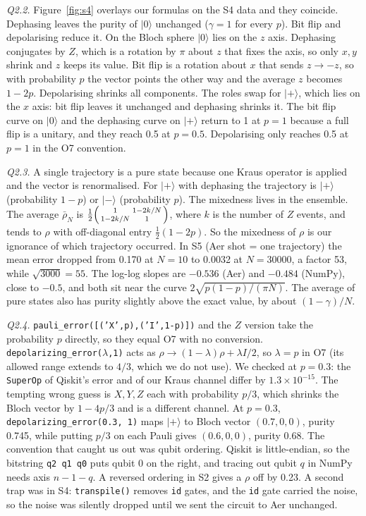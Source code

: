 \documentclass[10pt]{article}
\newcommand{\lab}[1]{\noindent\textit{#1}\;}
\begin{document}
\lab{Q2.2.} Figure~\ref{fig:s4} overlays our formulas on the S4 data and they coincide. Dephasing leaves the purity of $|0\rangle$ unchanged ($\gamma=1$ for every $p$). Bit flip and depolarising reduce it. On the Bloch sphere $|0\rangle$ lies on the $z$ axis. Dephasing conjugates by $Z$, which is a rotation by $\pi$ about $z$ that fixes the axis, so only $x,y$ shrink and $z$ keeps its value. Bit flip is a rotation about $x$ that sends $z\to-z$, so with probability $p$ the vector points the other way and the average $z$ becomes $1-2p$. Depolarising shrinks all components. The roles swap for $|+\rangle$, which lies on the $x$ axis: bit flip leaves it unchanged and dephasing shrinks it. The bit flip curve on $|0\rangle$ and the dephasing curve on $|+\rangle$ return to 1 at $p=1$ because a full flip is a unitary, and they reach 0.5 at $p=0.5$. Depolarising only reaches 0.5 at $p=1$ in the O7 convention.

\lab{Q2.3.} A single trajectory is a pure state because one Kraus operator is applied and the vector is renormalised. For $|+\rangle$ with dephasing the trajectory is $|+\rangle$ (probability $1-p$) or $|-\rangle$ (probability $p$). The mixedness lives in the ensemble. The average $\bar\rho_N$ is $\tfrac12\begin{psmallmatrix}1&1-2k/N\\1-2k/N&1\end{psmallmatrix}$, where $k$ is the number of $Z$ events, and tends to $\rho$ with off-diagonal entry $\tfrac12(1-2p)$. So the mixedness of $\rho$ is our ignorance of which trajectory occurred. In S5 (Aer shot = one trajectory) the mean error dropped from 0.170 at $N=10$ to 0.0032 at $N=30000$, a factor 53, while $\sqrt{3000}=55$. The log-log slopes are $-0.536$ (Aer) and $-0.484$ (NumPy), close to $-0.5$, and both sit near the curve $2\sqrt{p(1-p)/(\pi N)}$. The average of pure states also has purity slightly above the exact value, by about $(1-\gamma)/N$.

\lab{Q2.4.} \texttt{pauli\_error([('X',p),('I',1-p)])} and the $Z$ version take the probability $p$ directly, so they equal O7 with no conversion. \texttt{depolarizing\_error($\lambda$,1)} acts as $\rho\to(1-\lambda)\rho+\lambda I/2$, so $\lambda=p$ in O7 (its allowed range extends to $4/3$, which we do not use). We checked at $p=0.3$: the \texttt{SuperOp} of Qiskit's error and of our Kraus channel differ by $1.3\times10^{-15}$. The tempting wrong guess is $X,Y,Z$ each with probability $p/3$, which shrinks the Bloch vector by $1-4p/3$ and is a different channel. At $p=0.3$, \texttt{depolarizing\_error(0.3, 1)} maps $|+\rangle$ to Bloch vector $(0.7,0,0)$, purity 0.745, while putting $p/3$ on each Pauli gives $(0.6,0,0)$, purity 0.68. The convention that caught us out was qubit ordering. Qiskit is little-endian, so the bitstring \texttt{q2 q1 q0} puts qubit 0 on the right, and tracing out qubit $q$ in NumPy needs axis $n-1-q$. A reversed ordering in S2 gives a $\rho$ off by 0.23. A second trap was in S4: \texttt{transpile()} removes \texttt{id} gates, and the \texttt{id} gate carried the noise, so the noise was silently dropped until we sent the circuit to Aer unchanged.
\end{document}
